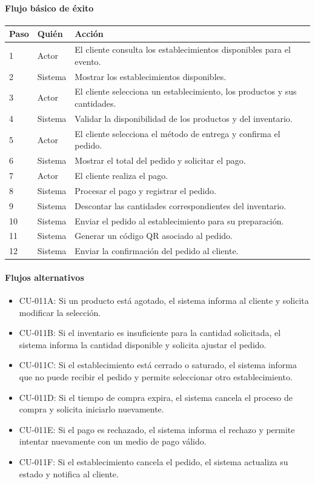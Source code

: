\paragraph{Flujo básico de éxito}
\begin{longtable}{P{1.1cm}P{1.8cm}P{10.5cm}}
\toprule
\textbf{Paso} & \textbf{Quién} & \textbf{Acción}\\
\midrule
{} & Actor & El cliente consulta los establecimientos disponibles para el evento.\\
2 & Sistema & Mostrar los establecimientos disponibles.\\
3 & Actor & El cliente selecciona un establecimiento, los productos y sus cantidades.\\
4 & Sistema & Validar la disponibilidad de los productos y del inventario.\\
5 & Actor & El cliente selecciona el método de entrega y confirma el pedido.\\
6 & Sistema & Mostrar el total del pedido y solicitar el pago.\\
7 & Actor & El cliente realiza el pago.\\
8 & Sistema & Procesar el pago y registrar el pedido.\\
9 & Sistema & Descontar las cantidades correspondientes del inventario.\\
10 & Sistema & Enviar el pedido al establecimiento para su preparación.\\
11 & Sistema & Generar un código QR asociado al pedido.\\
12 & Sistema & Enviar la confirmación del pedido al cliente.\\
\bottomrule
\end{longtable}

\paragraph{Flujos alternativos}
\begin{itemize}[leftmargin=1.4em, topsep=1pt]
  \item CU-011A: Si un producto está agotado, el sistema informa al cliente y solicita modificar la selección.
  \item CU-011B: Si el inventario es insuficiente para la cantidad solicitada, el sistema informa la cantidad disponible y solicita ajustar el pedido.
  \item CU-011C: Si el establecimiento está cerrado o saturado, el sistema informa que no puede recibir el pedido y permite seleccionar otro establecimiento.
  \item CU-011D: Si el tiempo de compra expira, el sistema cancela el proceso de compra y solicita iniciarlo nuevamente.
  \item CU-011E: Si el pago es rechazado, el sistema informa el rechazo y permite intentar nuevamente con un medio de pago válido.
  \item CU-011F: Si el establecimiento cancela el pedido, el sistema actualiza su estado y notifica al cliente.
\end{itemize}

